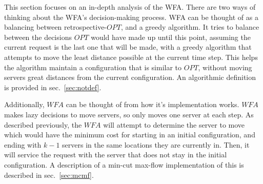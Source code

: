 This section focuses on an in-depth analysis of the WFA. There are two ways of thinking about the WFA's decision-making process. WFA can be thought of as a balancing between retrospective-$OPT$, and a greedy algorithm. It tries to balance between the decisions $OPT$ would have made up until this point, assuming the current request is the last one that will be made, with a greedy algorithm that attempts to move the least distance possible at the current time step. This helps the algorithm maintain a configuration that is similar to $OPT$, without moving servers great distances from the current configuration. An algorithmic definition is provided in sec.~\ref{sec:notdef}.

Additionally, $WFA$ can be thought of from how it's implementation works. $WFA$ makes lazy decisions to move servers, so only moves one server at each step. As described previously, the $WFA$ will attempt to determine the server to move which would have the minimum cost for starting in an initial configuration, and ending with $k-1$ servers in the same locations they are currently in. Then, it will service the request with the server that does not stay in the initial configuration. A description of a min-cut max-flow implementation of this is described in sec.~\ref{sec:mcmf}.